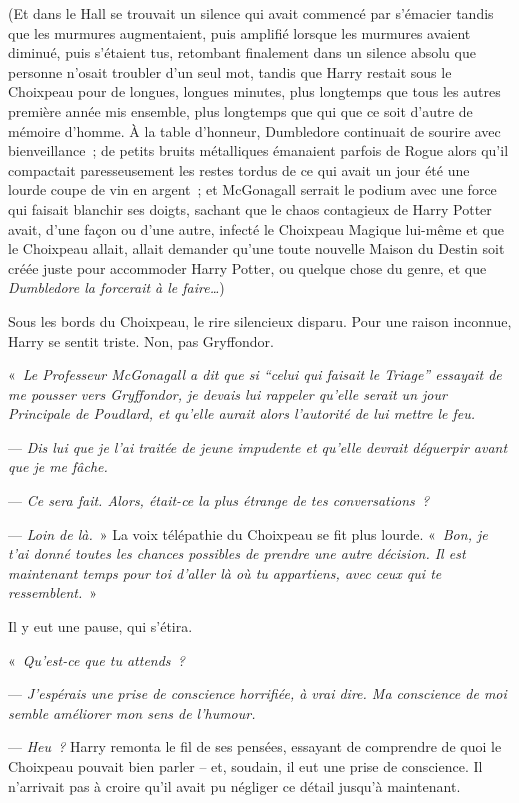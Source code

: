 (Et dans le Hall se trouvait un silence qui avait commencé par s'émacier tandis que les murmures augmentaient, puis amplifié lorsque les murmures avaient diminué, puis s'étaient tus, retombant finalement dans un silence absolu que personne n'osait troubler d'un seul mot, tandis que Harry restait sous le Choixpeau pour de longues, longues minutes, plus longtemps que tous les autres première année mis ensemble, plus longtemps que qui que ce soit d'autre de mémoire d'homme. À la table d'honneur, Dumbledore continuait de sourire avec bienveillance~; de petits bruits métalliques émanaient parfois de Rogue alors qu'il compactait paresseusement les restes tordus de ce qui avait un jour été une lourde coupe de vin en argent~; et McGonagall serrait le podium avec une force qui faisait blanchir ses doigts, sachant que le chaos contagieux de Harry Potter avait, d'une façon ou d'une autre, infecté le Choixpeau Magique lui-même et que le Choixpeau allait, allait demander qu'une toute nouvelle Maison du Destin soit créée juste pour accommoder Harry Potter, ou quelque chose du genre, et que \emph{Dumbledore la forcerait à le faire…})

Sous les bords du Choixpeau, le rire silencieux disparu. Pour une raison inconnue, Harry se sentit triste. Non, pas Gryffondor.

«~\emph{Le Professeur McGonagall a dit que si “celui qui faisait le Triage” essayait de me pousser vers Gryffondor, je devais lui rappeler qu'elle serait un jour Principale de Poudlard, et qu'elle aurait alors l'autorité de lui mettre le feu.}

--- \emph{Dis lui que je l'ai traitée de jeune impudente et qu'elle devrait déguerpir avant que je me fâche.}

--- \emph{Ce sera fait. Alors, était-ce la plus étrange de tes conversations~?}

--- \emph{Loin de là.}~» La voix télépathie du Choixpeau se fit plus lourde. «~\emph{Bon, je t'ai donné toutes les chances possibles de prendre une autre décision. Il est maintenant temps pour toi d'aller là où tu appartiens, avec ceux qui te ressemblent.}~»

Il y eut une pause, qui s'étira.

«~\emph{Qu'est-ce que tu attends~?}

--- \emph{J'espérais une prise de conscience horrifiée, à vrai dire. Ma conscience de moi semble améliorer mon sens de l'humour.}

--- \emph{Heu~?} Harry remonta le fil de ses pensées, essayant de comprendre de quoi le Choixpeau pouvait bien parler -- et, soudain, il eut une prise de conscience. Il n'arrivait pas à croire qu'il avait pu négliger ce détail jusqu'à maintenant.

